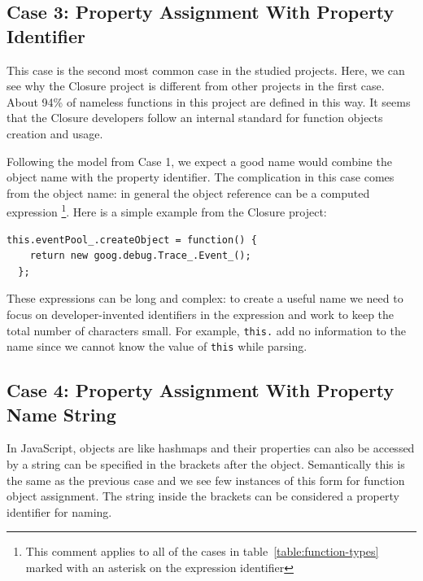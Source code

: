 \documentclass[10pt, preprint]{sigplanconf}
\begin{document}
\subsection{Case 3: Property Assignment With Property Identifier}
\label{sec:propid}
This case is the second most common case in the studied projects. Here, we can see why the Closure project is different from other projects in the first case. About 94\% of nameless functions in this project are defined in this way. It seems that the Closure developers follow an internal standard for function objects creation and usage.  

Following the model from Case 1, we expect a good name would combine the object name with the property identifier. The complication in this case comes from the object name: in general the object reference can be a computed expression \footnote[4]{This comment applies to all of the cases in table~\ref{table:function-types} marked with an asterisk on the expression identifier}. Here is a simple example from the Closure project: 
\lstset{basicstyle=\scriptsize}
\begin{lstlisting}[frame=single, language=myLang]
  this.eventPool_.createObject = function() {
    return new goog.debug.Trace_.Event_();
  };
\end{lstlisting}

 These expressions can be long and complex: to create a useful name we need to focus on developer-invented identifiers in the expression and work to keep the total number of characters small. For example, \verb|this.| add no information to the name since we cannot know the value of \verb|this| while parsing. 

\subsection{Case 4: Property Assignment With  Property Name String}
In JavaScript, objects are like hashmaps and their properties can also be accessed by a string can be specified in the brackets after the object. Semantically this is the same as the previous case and we see few instances of this form for function object assignment. The string inside the brackets can be considered a property identifier for naming.
\end{document}

